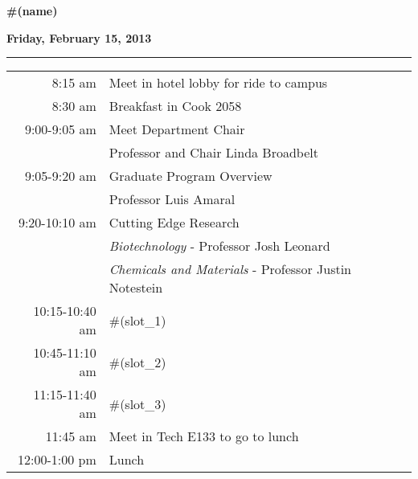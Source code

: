\documentclass{article}
\begin{document}
\vspace*{0.25\baselineskip}
\textbf{\LARGE{#(name)}}
\vspace*{0.25\baselineskip}

\centerline{\textbf{Friday, February 15, 2013}}
\vspace*{0.25\baselineskip}
\hrule
\vspace*{0.25\baselineskip}

\hspace{4.6cm}
\begin{tabular}{ r    l }

8:15 am         & Meet in hotel lobby for ride to campus \rule{0cm}{0.5cm} \\

8:30 am         & Breakfast in Cook 2058 \rule{0cm}{0.4cm} \\ 

9:00-9:05 am    & Meet Department Chair \rule{0cm}{0.4cm} \\ 
                & \hspace{5mm} Professor and Chair Linda Broadbelt \\ 

9:05-9:20 am    & Graduate Program Overview \rule{0cm}{0.4cm} \\ 
                & \hspace{5mm} Professor Luis Amaral \\ 

9:20-10:10 am   & Cutting Edge Research \rule{0cm}{0.4cm} \\ 
                & \hspace{5mm} \textit{Biotechnology} - Professor Josh Leonard \\ 
                & \hspace{5mm} \textit{Chemicals and Materials} - Professor Justin Notestein \\

10:15-10:40 am  & #(slot_1) \rule{0cm}{0.4cm} \\ 

10:45-11:10 am  & #(slot_2) \rule{0cm}{0.4cm} \\ 

11:15-11:40 am  & #(slot_3) \rule{0cm}{0.4cm} \\ 

11:45 am        & Meet in Tech E133 to go to lunch \rule{0cm}{0.4cm} \\ 

12:00-1:00 pm   & Lunch \rule{0cm}{0.4cm} \\ 


\end{tabular}
\end{document}
